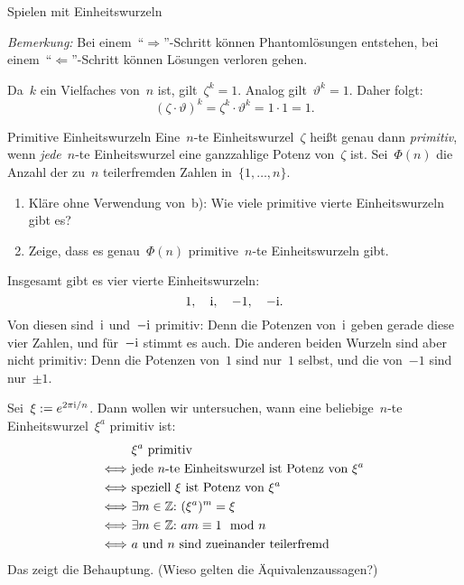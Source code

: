 \documentclass{algblatt}
\begin{document}
\begin{aufgabe}{Spielen mit Einheitswurzeln}
\begin{loesungE}
\emph{Bemerkung:} Bei einem~"`$\Rightarrow$"'-Schritt können Phantomlösungen
entstehen, bei einem~"`$\Leftarrow$"'-Schritt können Lösungen verloren gehen.

\item Da~$k$ ein Vielfaches von~$n$ ist, gilt~$\zeta^k = 1$. Analog
gilt~$\vartheta^k = 1$. Daher folgt:
\[ (\zeta \cdot \vartheta)^k = \zeta^k \cdot \vartheta^k = 1 \cdot 1 = 1. \]
\end{loesungE}
\end{aufgabe}

\ifloesungen\newpage\fi
\begin{aufgabe}{Primitive Einheitswurzeln}
Eine~$n$-te Einheitswurzel~$\zeta$ heißt genau dann \emph{primitiv}, wenn
\emph{jede}~$n$-te Einheitswurzel eine ganzzahlige Potenz von~$\zeta$ ist.
Sei~$\Phi(n)$ die Anzahl der zu~$n$ teilerfremden Zahlen
in~$\{1,\ldots,n\}$.
\begin{enumerate}
\item Kläre ohne Verwendung von~b): Wie viele primitive vierte Einheitswurzeln gibt es?
\item Zeige, dass es genau~$\Phi(n)$ primitive~$n$-te
Einheitswurzeln gibt.
\end{enumerate}
\begin{loesungE}
\item Insgesamt gibt es vier vierte Einheitswurzeln:
\[ 1,\quad \mathrm{i},\quad -1,\quad -\mathrm{i}. \]
Von diesen sind~$\mathrm{i}$ und~$-\mathrm{i}$ primitiv: Denn die Potenzen von~$\mathrm{i}$ geben
gerade diese vier Zahlen, und für~$-\mathrm{i}$ stimmt es auch. Die anderen beiden
Wurzeln sind aber nicht primitiv: Denn die Potenzen von~$1$ sind nur~$1$
selbst, und die von~$-1$ sind nur~$\pm 1$.

\item Sei~$\xi := e^{2\pi\mathrm{i}/n}$. Dann wollen wir untersuchen, wann eine
beliebige~$n$-te Einheitswurzel~$\xi^a$ primitiv ist:
\begin{align*}
  & \text{$\xi^a$ primitiv} \\
  \Longleftrightarrow\ &
    \text{jede $n$-te Einheitswurzel ist Potenz von~$\xi^a$} \\
  \Longleftrightarrow\ &
    \text{speziell~$\xi$ ist Potenz von~$\xi^a$} \\
  \Longleftrightarrow\ &
    \exists m \in \ZZ{:}\ 
    (\xi^a)^m = \xi \\
  \Longleftrightarrow\ &
    \exists m \in \ZZ{:}\ 
    am \equiv 1 \mod n \\
  \Longleftrightarrow\ &
    \text{$a$ und $n$ sind zueinander teilerfremd}
\end{align*}
Das zeigt die Behauptung. (Wieso gelten die Äquivalenzaussagen?)
\end{loesungE}
\end{aufgabe}
\end{document}

